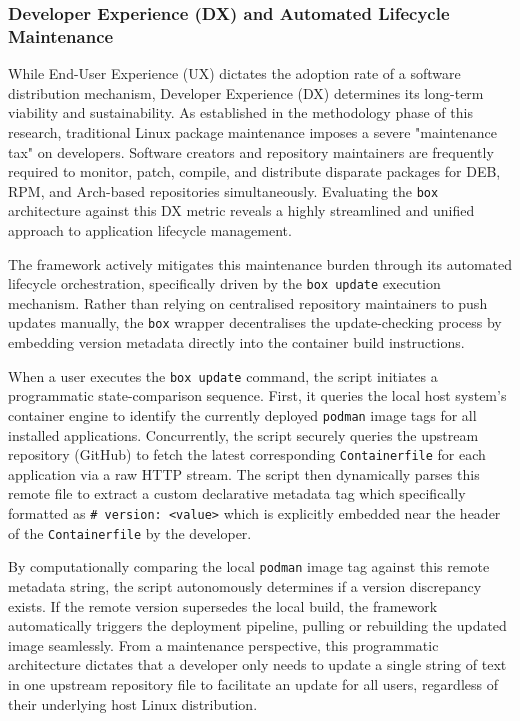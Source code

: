 \documentclass[journal,onecolumn]{IEEEtran}
\newcommand{\code}[1]{\texttt{#1}}
\begin{document}
\subsubsection{Developer Experience (DX) and Automated Lifecycle Maintenance}

While End-User Experience (UX) dictates the adoption rate of a software distribution mechanism, Developer Experience (DX) determines its long-term viability and sustainability. As established in the methodology phase of this research, traditional Linux package maintenance imposes a severe "maintenance tax" on developers. Software creators and repository maintainers are frequently required to monitor, patch, compile, and distribute disparate packages for DEB, RPM, and Arch-based repositories simultaneously. Evaluating the \code{box} architecture against this DX metric reveals a highly streamlined and unified approach to application lifecycle management.

The framework actively mitigates this maintenance burden through its automated lifecycle orchestration, specifically driven by the \code{box update} execution mechanism. Rather than relying on centralised repository maintainers to push updates manually, the \code{box} wrapper decentralises the update-checking process by embedding version metadata directly into the container build instructions. 

When a user executes the \code{box update} command, the script initiates a programmatic state-comparison sequence. First, it queries the local host system's container engine to identify the currently deployed \code{podman} image tags for all installed applications. Concurrently, the script securely queries the upstream repository (GitHub) to fetch the latest corresponding \code{Containerfile} for each application via a raw HTTP stream. The script then dynamically parses this remote file to extract a custom declarative metadata tag which specifically formatted as \code{\# version: <value>} which is explicitly embedded near the header of the \code{Containerfile} by the developer.

By computationally comparing the local \code{podman} image tag against this remote metadata string, the script autonomously determines if a version discrepancy exists. If the remote version supersedes the local build, the framework automatically triggers the deployment pipeline, pulling or rebuilding the updated image seamlessly. From a maintenance perspective, this programmatic architecture dictates that a developer only needs to update a single string of text in one upstream repository file to facilitate an update for all users, regardless of their underlying host Linux distribution.
\end{document}
